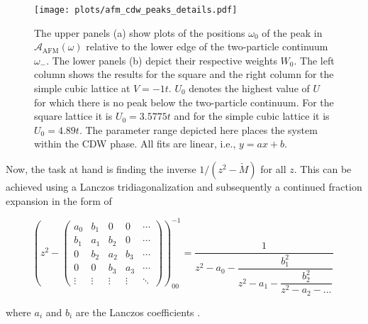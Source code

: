 \documentclass[
    reprint, 
    aps,
    preprintnumbers,
    twocolumn,
    prb,
    superscriptaddress
]{revtex4-2}
\newcommand{\spectral}[1]{\mathcal{A}_\text{#1}  (\omega)}
\begin{document}
\begin{figure}
    \centering
    \texttt{[image: plots/afm\_cdw\_peaks\_details.pdf]}
    \caption{The upper panels (a) show plots of the positions $\omega_0$ of the peak in $\spectral{AFM}$ relative to the lower edge of the two-particle continuum $\omega_-$.
    The lower panels (b) depict their respective weights $W_0$.
    The left column shows the results for the square and the right column for the simple cubic lattice at $V=-1t$.
    $U_0$ denotes the highest value of $U$ for which there is no peak below the two-particle continuum.
    For the square lattice it is $U_0 = 3.5775t$ and for the simple cubic lattice it is $U_0 = 4.89t$.
    The parameter range depicted here places the system within the CDW phase.
    All fits are linear, i.e., $y=ax + b$.}
    \label{fig:afm_cdw_peaks_details}
\end{figure}


Now, the task at hand is finding the inverse $1/(z^2 - \check{M})$ for all $z$.
This can be achieved using a Lanczos tridiagonalization and subsequently a continued fraction expansion in the form of

\begin{widetext}
\begin{equation}
    \left( z^2 - \begin{pmatrix}
        a_0 & b_1 & 0 & 0 & \cdots \\
        b_1 & a_1 & b_2 & 0 & \cdots \\
        0 & b_2 & a_2 & b_3 & \cdots \\
        0 & 0 & b_3 & a_3 & \cdots \\
        \vdots & \vdots & \vdots & \vdots & \ddots
    \end{pmatrix} \right)_{00}^{-1} = \dfrac{1}{z^2 - a_0 - \dfrac{b_1^2}{z^2 - a_1 - \dfrac{b_2^2}{ z^2 - a_2 - \hdots}}}\,\,
\end{equation}
\end{widetext}

where $a_i$ and $b_i$ are the Lanczos coefficients \cite{PettiforRecursion,ViswanathRecursion}.
\end{document}
